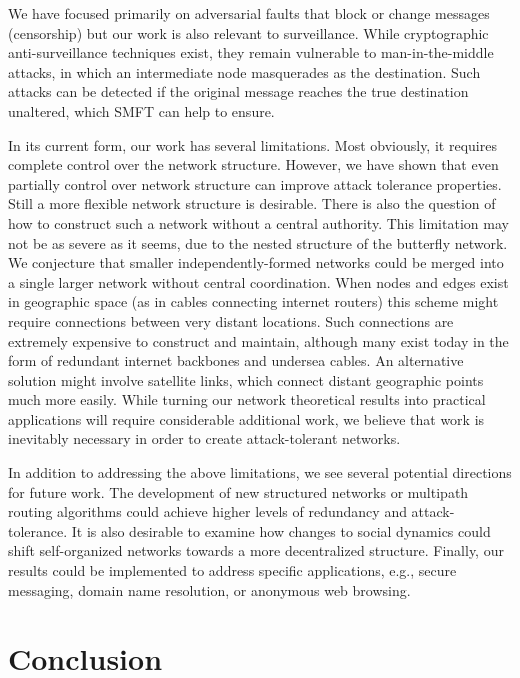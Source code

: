 \documentclass[10pt,letterpaper]{article}
\begin{document}
We have focused primarily on adversarial faults that block or
change messages (censorship) but our work is also relevant to
surveillance.
While cryptographic anti-surveillance techniques exist,
they remain vulnerable to man-in-the-middle attacks,
in which an intermediate node masquerades as the destination.
Such attacks can be detected if the original message reaches the true
destination unaltered,
which SMFT can help to ensure.

In its current form, our work has several limitations.
Most obviously, it requires complete control over the network structure.
However, we have shown that even partially control over network structure can
improve attack tolerance properties.
Still a more flexible network structure is desirable.
There is also the question of how to construct such a network without a central
authority.
This limitation may not be as severe as it seems,
due to the nested structure of the butterfly network.
We conjecture that smaller independently-formed networks could be
merged into a single larger network without central coordination.
When nodes and edges exist in geographic space (as in cables connecting internet
routers) this scheme might require connections between very distant locations.
Such connections are extremely expensive to construct and maintain,
although many exist today in the form of redundant internet backbones and
undersea cables. An alternative solution might involve satellite links,
which connect distant geographic points much more easily.
While turning our network theoretical results into practical applications
will require considerable additional work, we believe that work is inevitably
necessary in order to create attack-tolerant networks.

In addition to addressing the above limitations,
we see several potential directions for future work.
The development of new structured networks or multipath routing algorithms
could achieve higher levels of redundancy and attack-tolerance.
It is also desirable to examine how changes to social dynamics could shift
self-organized networks towards a more decentralized structure.
Finally, our results could be implemented to address specific applications, e.g.,
secure messaging, domain name resolution, or anonymous web browsing.

\section*{Conclusion}
\label{sec-conclusion}
\end{document}
